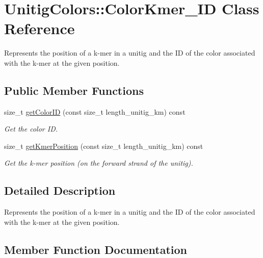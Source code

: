 \hypertarget{classUnitigColors_1_1ColorKmer__ID}{}\section{Unitig\+Colors\+:\+:Color\+Kmer\+\_\+\+ID Class Reference}
\label{classUnitigColors_1_1ColorKmer__ID}


Represents the position of a k-\/mer in a unitig and the ID of the color associated with the k-\/mer at the given position.  


\subsection*{Public Member Functions}
\begin{DoxyCompactItemize}
\item 
size\+\_\+t \hyperlink{classUnitigColors_1_1ColorKmer__ID_adce9be6ae244622f2b5beec37aa580e7}{get\+Color\+ID} (const size\+\_\+t length\+\_\+unitig\+\_\+km) const
\begin{DoxyCompactList}\small\item\em Get the color ID. \end{DoxyCompactList}\item 
size\+\_\+t \hyperlink{classUnitigColors_1_1ColorKmer__ID_a53c6284450e368baf4373409b802fe0b}{get\+Kmer\+Position} (const size\+\_\+t length\+\_\+unitig\+\_\+km) const
\begin{DoxyCompactList}\small\item\em Get the k-\/mer position (on the forward strand of the unitig). \end{DoxyCompactList}\end{DoxyCompactItemize}


\subsection{Detailed Description}
Represents the position of a k-\/mer in a unitig and the ID of the color associated with the k-\/mer at the given position. 

\subsection{Member Function Documentation}
\mbox{\label{classUnitigColors_1_1ColorKmer__ID_adce9be6ae244622f2b5beec37aa580e7}} 
